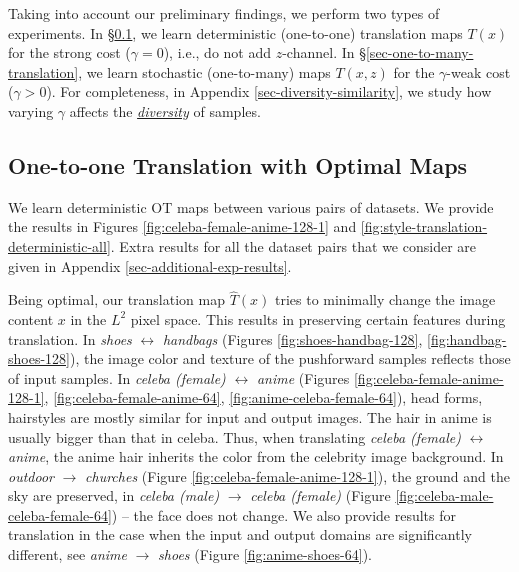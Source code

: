 \documentclass{article} %
\begin{document}
\vspace{-2mm}Taking into account our preliminary findings, we perform two types of experiments. In \S\ref{sec-one-to-one-translation}, we learn deterministic (one-to-one) translation maps $T(x)$ for the strong cost ($\gamma=0$), i.e., do not add $z$-channel.
In \S\ref{sec-one-to-many-translation}, we learn stochastic (one-to-many) maps $T(x,z)$ for the $\gamma$-weak cost ($\gamma>0$). For completeness, in Appendix \ref{sec-diversity-similarity}, we study how varying $\gamma$ affects the \underline{\textit{diversity}} of samples.

\vspace{-2.5mm}\subsection{One-to-one Translation with Optimal Maps}
\label{sec-one-to-one-translation}

\vspace{-2.5mm}We learn deterministic OT maps between various pairs of datasets. We provide the results in Figures \ref{fig:celeba-female-anime-128-1} and \ref{fig:style-translation-deterministic-all}. Extra results for all the dataset pairs that we consider are given in Appendix \ref{sec-additional-exp-results}.

\vspace{-1.5mm}Being optimal, our translation map $\widehat{T}(x)$ tries to minimally change the image content $x$ in the $L^{2}$ pixel space. This results in preserving certain features during translation. In \textit{shoes} $\leftrightarrow$ \textit{handbags} (Figures \ref{fig:shoes-handbag-128}, \ref{fig:handbag-shoes-128}), the image color and texture of the pushforward samples reflects those of input samples. In \textit{celeba (female)} $\leftrightarrow$ \textit{anime} (Figures \ref{fig:celeba-female-anime-128-1}, \ref{fig:celeba-female-anime-64}, \ref{fig:anime-celeba-female-64}), head forms, hairstyles are mostly similar for input and output images. The hair in anime is usually bigger than that in celeba. Thus, when translating \textit{celeba (female)} $\leftrightarrow$ \textit{anime}, the anime hair inherits the color from the celebrity image background. In \textit{outdoor} $\rightarrow$ \textit{churches} (Figure \ref{fig:celeba-female-anime-128-1}), the ground and the sky are preserved, in \textit{celeba (male)} $\rightarrow$ \textit{celeba (female)} (Figure \ref{fig:celeba-male-celeba-female-64}) -- the face does not change. We also provide results for translation in the case when the input and output domains are significantly different, see \textit{anime} $\rightarrow$ \textit{shoes} (Figure \ref{fig:anime-shoes-64}).
\end{document}
